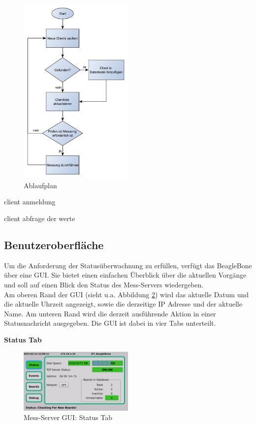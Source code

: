 \begin{figure}[H]
\begin{center}
\includegraphics[width=0.5\textwidth ]{img/general/Ablaufplan_Master.pdf}
\caption{Ablaufplan}
\label{figure_Ablaufplan_Master}
\end{center}
\end{figure}
 
  client anmeldung
 
 client abfrage der werte
 
 
\newpage
\subsection{Benutzeroberfläche}
Um die Anforderung der Statusüberwachnung zu erfüllen, verfügt das BeagleBone über eine \ac{GUI}. Sie bietet einen einfachen Überblick über die aktuellen Vorgänge und soll auf einen Blick den Status des Mess-Servers wiedergeben.\\
Am oberen Rand der \ac{GUI} (sieht u.a. Abbildung \ref{figure_MessServerGUIStatus}) wird das aktuelle Datum und die aktuelle Uhrzeit angezeigt, sowie die derzeitige IP Adresse und der aktuelle Name. Am unteren Rand wird die derzeit ausführende Aktion in einer Statusnachricht ausgegeben.
Die \ac{GUI} ist dabei in vier Tabs unterteilt.

\textbf{Status Tab}

\begin{figure}[H]
\begin{center}
\includegraphics[width=0.5\textwidth ]{img/GUI/Server_GUI_Status1.png}
\caption{Mess-Server GUI: Status Tab}
\label{figure_MessServerGUIStatus}
\end{center}
\end{figure}

